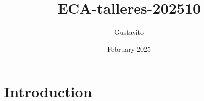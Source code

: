 \documentclass{article}
\title{ECA-talleres-202510}
\author{Gustavito}
\date{February 2025}
\begin{document}
\maketitle

\section{Introduction}
\end{document}
